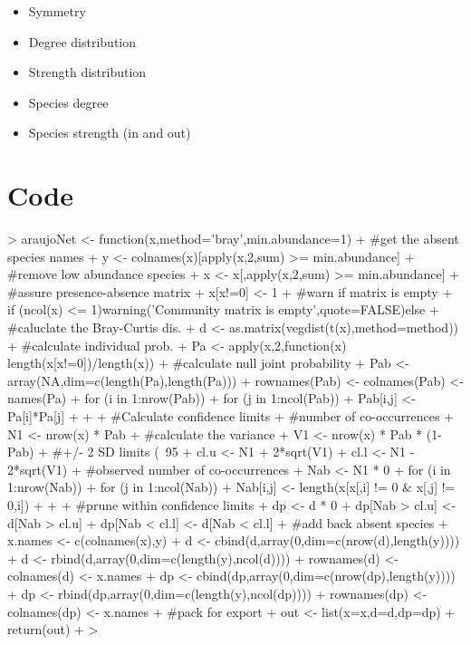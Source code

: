 \documentclass[12pt]{article}
\begin{document}
\begin{itemize}
\item Symmetry
\item Degree distribution
\item Strength distribution
\item Species degree
\item Species strength (in and out)
\end{itemize}


\section{Code}

\begin{Schunk}
\begin{Sinput}
> araujoNet <- function(x,method='bray',min.abundance=1){
+                                         #get the absent species names
+   y <- colnames(x)[apply(x,2,sum) >= min.abundance]
+                                         #remove low abundance species
+   x <- x[,apply(x,2,sum) >= min.abundance]
+                                         #assure presence-absence matrix
+   x[x!=0] <- 1
+                                         #warn if matrix is empty
+   if (ncol(x) <= 1){warning('Community matrix is empty',quote=FALSE)}else{}
+                                         #caluclate the Bray-Curtis dis.
+   d <- as.matrix(vegdist(t(x),method=method))
+                                         #calculate individual prob.
+   Pa <- apply(x,2,function(x) length(x[x!=0])/length(x))
+                                         #calculate null joint probability 
+   Pab <- array(NA,dim=c(length(Pa),length(Pa)))
+   rownames(Pab) <- colnames(Pab) <- names(Pa)
+   for (i in 1:nrow(Pab)){
+     for (j in 1:ncol(Pab)){
+       Pab[i,j] <- Pa[i]*Pa[j]
+     }
+   }
+                                         #Calculate confidence limits
+                                         #number of co-occurrences
+   N1 <- nrow(x) * Pab
+                                         #calculate the variance
+   V1 <- nrow(x) * Pab * (1-Pab)
+                                         #+/- 2 SD limits (~95%
+   cl.u <- N1 + 2*sqrt(V1)
+   cl.l <- N1 - 2*sqrt(V1)
+                                         #observed number of co-occurrences
+   Nab <- N1 * 0 
+   for (i in 1:nrow(Nab)){
+     for (j in 1:ncol(Nab)){
+       Nab[i,j] <- length(x[x[,i] != 0 & x[,j] != 0,i])
+     }
+   }
+                                         #prune within confidence limits
+   dp <- d * 0
+   dp[Nab > cl.u] <- d[Nab > cl.u]
+   dp[Nab < cl.l] <- d[Nab < cl.l]
+                                         #add back absent species
+   x.names <- c(colnames(x),y)
+   d <- cbind(d,array(0,dim=c(nrow(d),length(y))))
+   d <- rbind(d,array(0,dim=c(length(y),ncol(d))))
+   rownames(d) <- colnames(d) <- x.names
+   dp <- cbind(dp,array(0,dim=c(nrow(dp),length(y))))
+   dp <- rbind(dp,array(0,dim=c(length(y),ncol(dp))))
+   rownames(dp) <- colnames(dp) <- x.names
+                                         #pack for export
+   out <- list(x=x,d=d,dp=dp)
+   return(out)
+ }
> 
\end{Sinput}
\end{Schunk}
\end{document}
